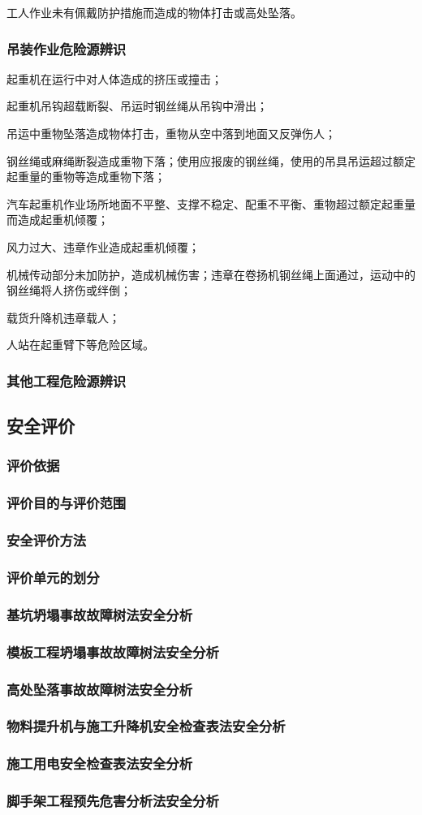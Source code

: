  工人作业未有佩戴防护措施而造成的物体打击或高处坠落。

\subsubsection{吊装作业危险源辨识}

 起重机在运行中对人体造成的挤压或撞击；

 起重机吊钩超载断裂、吊运时钢丝绳从吊钩中滑出；

 吊运中重物坠落造成物体打击，重物从空中落到地面又反弹伤人；

 钢丝绳或麻绳断裂造成重物下落；使用应报废的钢丝绳，使用的吊具吊运超过额定起重量的重物等造成重物下落；

 汽车起重机作业场所地面不平整、支撑不稳定、配重不平衡、重物超过额定起重量而造成起重机倾覆；

 风力过大、违章作业造成起重机倾覆；

 机械传动部分未加防护，造成机械伤害；违章在卷扬机钢丝绳上面通过，运动中的钢丝绳将人挤伤或绊倒；

 载货升降机违章载人；

 人站在起重臂下等危险区域。

\subsubsection{其他工程危险源辨识}
\subsection{安全评价}
\subsubsection{评价依据}
\subsubsection{评价目的与评价范围}
\subsubsection{安全评价方法}
\subsubsection{评价单元的划分}
\subsubsection{基坑坍塌事故故障树法安全分析}
\subsubsection{模板工程坍塌事故故障树法安全分析}
\subsubsection{高处坠落事故故障树法安全分析}
\subsubsection{物料提升机与施工升降机安全检查表法安全分析}
\subsubsection{施工用电安全检查表法安全分析}
\subsubsection{脚手架工程预先危害分析法安全分析}
